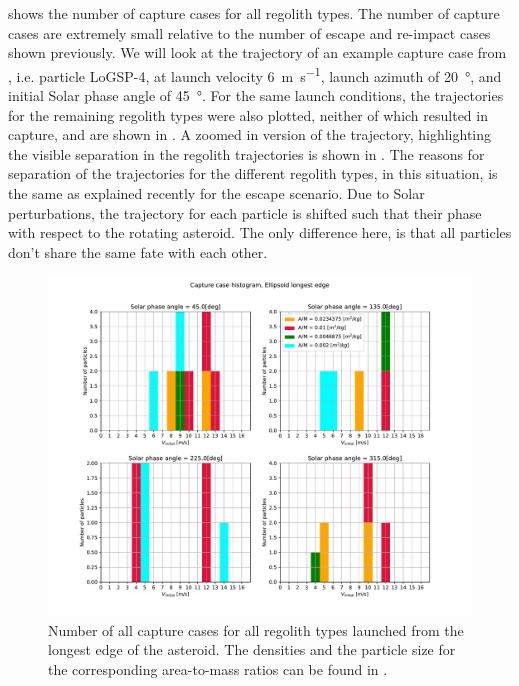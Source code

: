  shows the number of capture cases for all regolith types. The number of capture cases are extremely small relative to the number of escape and re-impact cases shown previously. We will look at the trajectory of an example capture case from , i.e. particle LoGSP-4, at launch velocity \SI{6}{\metre\per\second}, launch azimuth of \SI{20}{\degree}, and initial Solar phase angle of \SI{45}{\degree}. For the same launch conditions, the trajectories for the remaining regolith types were also plotted, neither of which resulted in capture, and are shown in . A zoomed in version of the trajectory, highlighting the visible separation in the regolith trajectories is shown in . The reasons for separation of the trajectories for the different regolith types, in this situation, is the same as explained recently for the escape scenario. Due to Solar perturbations, the trajectory for each particle is shifted such that their phase with respect to the rotating asteroid. The only difference here, is that all particles don't share the same fate with each other.
\begin{figure}[htb]
\centering
\captionsetup{justification=centering}
\includegraphics[width=\textwidth, height=0.4\textheight, keepaspectratio=true]{longest_edge_perturbations/multiple_regolith_types/allPhases_captureCases.pdf}
\caption{Number of all capture cases for all regolith types launched from the longest edge of the asteroid. The densities and the particle size for the corresponding area-to-mass ratios can be found in .}
\label{fig:longestEdge_allParticles_capture_hist}
\end{figure}
